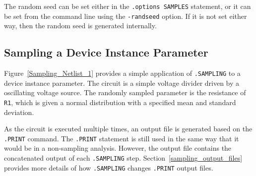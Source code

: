 The random seed can be set either in the \texttt{.options SAMPLES} statement, or 
it can be set from the command line using the \texttt{-randseed} option.  If it 
is not set either way, then the random seed is generated internally.

\subsection{Sampling a Device Instance Parameter}
\label{sampling_InstanceParam}
Figure~\ref{Sampling_Netlist_1} provides a simple application of \verb|.SAMPLING| 
to a device instance parameter.  The circuit is a simple voltage divider driven 
by a oscillating voltage source.  The randomly sampled parameter is the resistance 
of \texttt{R1}, which is given a normal distribution with a specified mean and 
standard deviation.

As the circuit is executed multiple times, an output file is generated based on 
the \verb|.PRINT| command.  The \verb|.PRINT| statement is still used in the same 
way that it would be in a non-sampling analysis.  However, the output file 
contains the concatenated output of each \verb|.SAMPLING| step.  
Section~\ref{sampling_output_files} provides more details of how \texttt{.SAMPLING} 
changes \texttt{.PRINT} output files.

